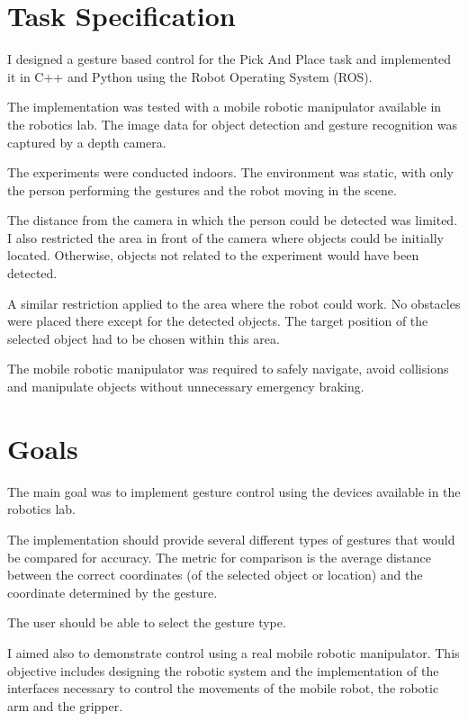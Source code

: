 \section{Task Specification}
I designed a gesture based control for the Pick And Place task and implemented it in C++ and Python using the Robot Operating System (ROS).\par
The implementation was tested with a mobile robotic manipulator available in the robotics lab. The image data for object detection and gesture recognition was captured by a depth camera.\par
The experiments were conducted indoors. The environment was static, with only the person performing the gestures and the robot moving in the scene.\par
The distance from the camera in which the person could be detected was limited. I also restricted the area in front of the camera where objects could be initially located. Otherwise, objects not related to the experiment would have been detected.\par
A similar restriction applied to the area where the robot could work. No obstacles were placed there except for the detected objects. The target position of the selected object had to be chosen within this area.\par
The mobile robotic manipulator was required to safely navigate, avoid collisions and manipulate objects without unnecessary emergency braking.\par

\section{Goals}
The main goal was to implement gesture control using the devices available in the robotics lab.\par
The implementation should provide several different types of gestures that would be compared for accuracy. The metric for comparison is the average distance between the correct coordinates (of the selected object or location) and the coordinate determined by the gesture.\par
The user should be able to select the gesture type.\par
I aimed also to demonstrate control using a real mobile robotic manipulator. This objective includes designing the robotic system and the implementation of the interfaces necessary to control the movements of the mobile robot, the robotic arm and the gripper.\par
